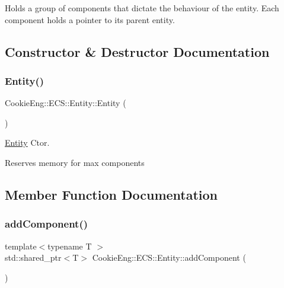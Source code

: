 Holds a group of components that dictate the behaviour of the entity. Each component holds a pointer to its parent entity. 

\subsection{Constructor \& Destructor Documentation}
\mbox{\label{class_cookie_eng_1_1_e_c_s_1_1_entity_a8e57da947b47b9124ad26fabf7cbbb89}} 
\subsubsection{\texorpdfstring{Entity()}{Entity()}}
{\footnotesize\ttfamily Cookie\+Eng\+::\+E\+C\+S\+::\+Entity\+::\+Entity (\begin{DoxyParamCaption}{ }\end{DoxyParamCaption})}



\hyperlink{class_cookie_eng_1_1_e_c_s_1_1_entity}{Entity} Ctor. 

Reserves memory for max components 

\subsection{Member Function Documentation}
\mbox{\label{class_cookie_eng_1_1_e_c_s_1_1_entity_a7b24f6959d8f1686e02e8ae5ef61f08c}} 
\subsubsection{\texorpdfstring{add\+Component()}{addComponent()}}
{\footnotesize\ttfamily template$<$typename T $>$ \\
std\+::shared\+\_\+ptr$<$T$>$ Cookie\+Eng\+::\+E\+C\+S\+::\+Entity\+::add\+Component (\begin{DoxyParamCaption}{ }\end{DoxyParamCaption})\hspace{0.3cm}{\ttfamily [inline]}}



